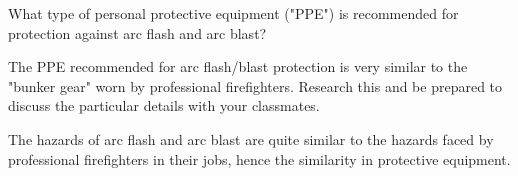 

What type of personal protective equipment ("PPE") is recommended for protection against arc flash and arc blast?







The PPE recommended for arc flash/blast protection is very similar to the "bunker gear" worn by professional firefighters.  Research this and be prepared to discuss the particular details with your classmates.







The hazards of arc flash and arc blast are quite similar to the hazards faced by professional firefighters in their jobs, hence the similarity in protective equipment.




